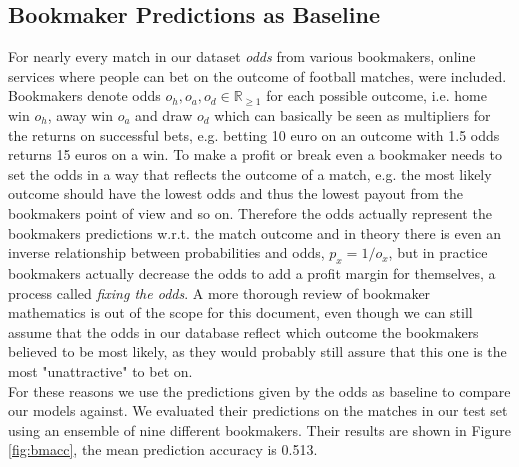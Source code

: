 \documentclass[a4paper]{article}
\begin{document}
\subsection{Bookmaker Predictions as Baseline}
For nearly every match in our dataset \textit{odds} from various bookmakers, online services where people can bet on the outcome of football matches, were included. Bookmakers denote odds $o_h, o_a, o_d \in \mathbb{R}_{\geq 1}$ for each possible outcome, i.e. home win $o_h$, away win $o_a$ and draw $o_d$ which can basically be seen as multipliers for the returns on successful bets, e.g. betting 10 euro on an outcome with 1.5 odds returns 15 euros on a win. To make a profit or break even a bookmaker needs to set the odds in a way that reflects the outcome of a match, e.g. the most likely outcome should have the lowest odds and thus the lowest payout from the bookmakers point of view and so on. Therefore the odds actually represent the bookmakers predictions w.r.t. the match outcome and in theory there is even an inverse relationship between probabilities and odds, $p_x = 1/o_x$, but in practice bookmakers actually decrease the odds to add a profit margin for themselves, a process called \textit{fixing the odds}. A more thorough review of bookmaker mathematics is out of the scope for this document, even though we can still assume that the odds in our database reflect which outcome the bookmakers believed to be most likely, as they would probably still assure that this one is the most "unattractive" to bet on. \\
For these reasons we use the predictions given by the odds as baseline to compare our models against. We evaluated their predictions on the matches in our test set using an ensemble of nine different bookmakers. Their results are shown in Figure \ref{fig:bmacc}, the mean prediction accuracy is 0.513.
\end{document}
